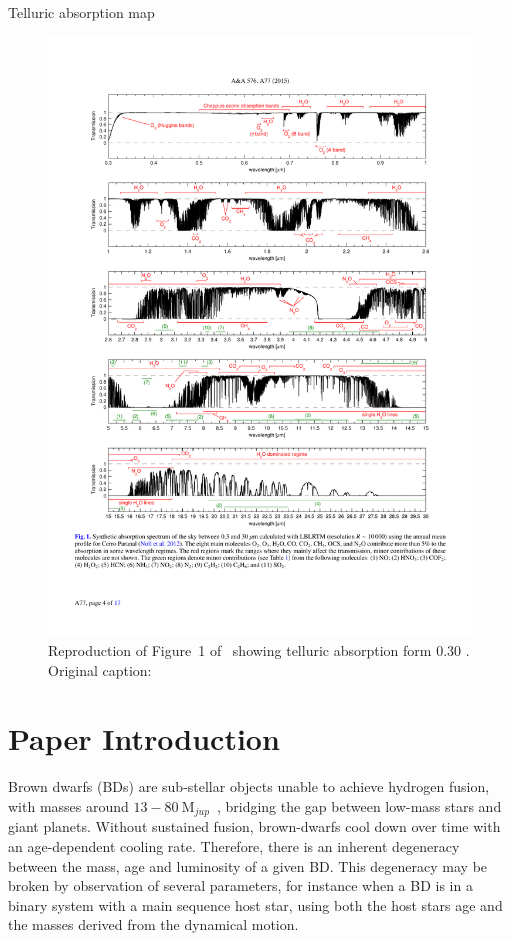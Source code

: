 Telluric absorption map
\begin{figure}
    \centering
    \includegraphics[width=0.9\linewidth]{figures/advanced_material/cropped_molecfit_absorbtion}
    \caption{Reproduction of Figure~1 of~\citet{smette_molecfit_2015} showing telluric absorption form 0.30 \um. Original caption:}
    \label{fig:croppedmolecfitabsorbtion}
\end{figure}




\section{Paper Introduction}
\label{sec:intro}
Brown dwarfs (BDs) are sub-stellar objects unable to achieve hydrogen fusion, with masses around \(13-80~\textrm{M}_{jup} \)~\citep{chabrier_theory_2000}, bridging the gap between low-mass stars and giant planets. Without sustained fusion, brown-dwarfs cool down over time with an age-dependent cooling rate. Therefore, there is an inherent degeneracy between the mass, age and luminosity of a given BD\citep{burrows_nongray_1997}. This degeneracy may be broken by observation of several parameters, for instance when a BD is in a binary system with a main sequence host star, using both the host stars age and the masses derived from the dynamical motion.

